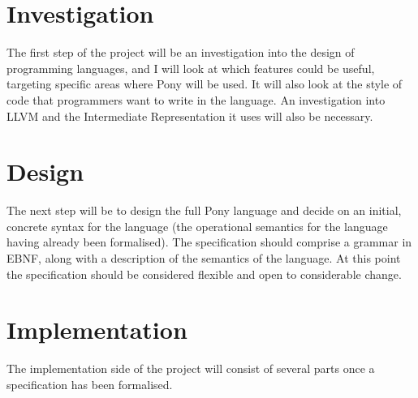 \documentclass[11pt,a4paper]{report}
\begin{document}
\section{Investigation}
The first step of the project will be an investigation into the design of programming languages, and I will look at which features could be useful, targeting specific areas where Pony will be used.
It will also look at the style of code that programmers want to write in the language.
An investigation into LLVM and the Intermediate Representation it uses will also be necessary.

\section{Design}
The next step will be to design the full Pony language and decide on an initial, concrete syntax for the language (the operational semantics for the language having already been formalised).
The specification should comprise a grammar in EBNF, along with a description of the semantics of the language.
At this point the specification should be considered flexible and open to considerable change.

\section{Implementation}
The implementation side of the project will consist of several parts once a specification has been formalised.
\end{document}
